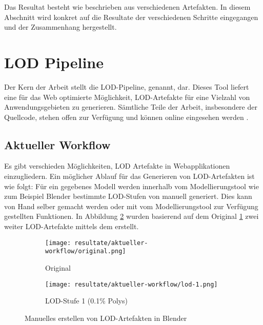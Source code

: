 Das Resultat besteht wie beschrieben aus verschiedenen Artefakten. In diesem Abschnitt wird konkret auf die Resultate der verschiedenen Schritte eingegangen und der Zusammenhang hergestellt.

\section{LOD Pipeline}

Der Kern der Arbeit stellt die LOD-Pipeline,  genannt, dar. Dieses Tool liefert eine für das Web optimierte Möglichkeit, LOD-Artefakte für eine Vielzahl von Anwendungsgebieten zu generieren. Sämtliche Teile der Arbeit, insbesondere der Quellcode, stehen offen zur Verfügung und können online eingesehen werden \cite{lode}.

\subsection{Aktueller Workflow}

Es gibt verschieden Möglichkeiten, LOD Artefakte in Webapplikationen einzugliedern. Ein möglicher Ablauf für das Generieren von LOD-Artefakten ist wie folgt:
Für ein gegebenes Modell werden innerhalb vom Modellierungstool wie zum Beispiel Blender bestimmte LOD-Stufen von manuell generiert. Dies kann von Hand selber gemacht werden oder mit vom Modellierungstool zur Verfügung gestellten Funktionen. In Abbildung \ref{fig:manualLodGenerationInBlender} wurden basierend auf dem Original \ref{fig:manualLodGenerationInBlenderOriginal} zwei weiter LOD-Artefakte mittels dem  erstellt.

\begin{figure}[H]
  \centering
  \begin{subfigure}{.45\textwidth}
    \centering
    \texttt{[image: resultate/aktueller-workflow/original.png]}
    \caption{Original}
    \label{fig:manualLodGenerationInBlenderOriginal}
  \end{subfigure}
  \begin{subfigure}{.45\textwidth}
    \centering
    \texttt{[image: resultate/aktueller-workflow/lod-1.png]}
    \caption{LOD-Stufe 1 (0.1\% Polys)}
  \end{subfigure}
  \caption{Manuelles erstellen von LOD-Artefakten in Blender}
  \label{fig:manualLodGenerationInBlender}
\end{figure}

